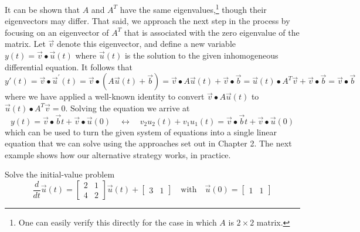\documentclass[../book.tex]{subfiles}
\begin{document}
It can be shown that \(A\) and \(A^T\) have the same eigenvalues,\footnote{One can easily verify this directly for the case in which \(A\) is \(2\times 2\) matrix.} though their eigenvectors may differ. That said, we approach the next step in the process by focusing on an eigenvector of \(A^T\) that is associated with the zero eigenvalue of the matrix. Let \(\vec{v}\) denote this eigenvector, and define a new variable \(y(t) = \vec{v}\bullet \vec{u}(t)\) where \(\vec{u}(t)\) is the solution to the given inhomogeneous differential equation. It follows that
\begin{equation}\label{eq:sys-52}
y'(t) = \vec{v} \bullet \vec{u}^{ \prime}(t) 
= \vec{v} \bullet ( A \vec{u}(t) + \vec{b} )
= \vec{v} \bullet A \vec{u}(t) + \vec{v} \bullet \vec{b}
= \vec{u}(t) \bullet A^T \vec{v} + \vec{v} \bullet \vec{b}
= \vec{v} \bullet \vec{b}
\end{equation}
where we have applied a well-known identity to convert \(\vec{v} \bullet A \vec{u}(t)\) to \(\vec{u}(t) \bullet A^T \vec{v} = 0\). Solving the equation we arrive at
\begin{equation}\label{eq:sys-53}
y(t) = \vec{v}\bullet\vec{b} t + \vec{v}\bullet\vec{u}(0)
\quad\leftrightarrow\quad
v_2 u_2(t) + v_1  u_1(t) =
\vec{v}\bullet\vec{b} t + \vec{v}\bullet\vec{u}(0)
\end{equation}
which can be used to turn the given system of equations into a single linear equation that we can solve using the approaches set out in Chapter 2. The next example shows how our alternative strategy works, in practice.

\begin{example} \label{eg:ivp1}
Solve the initial-value problem
\begin{equation}\label{eq:sys-54}
\frac{d}{dt} \vec{u}(t)
=
\begin{bmatrix} 2 & 1 \\ 4 & 2 \end{bmatrix} \vec{u}(t) + \begin{bmatrix} 3 & 1 \end{bmatrix}
\quad
\text{with}
\quad
\vec{u}(0) = \begin{bmatrix} 1 & 1 \end{bmatrix}
\end{equation}
\end{example}
\end{document}
